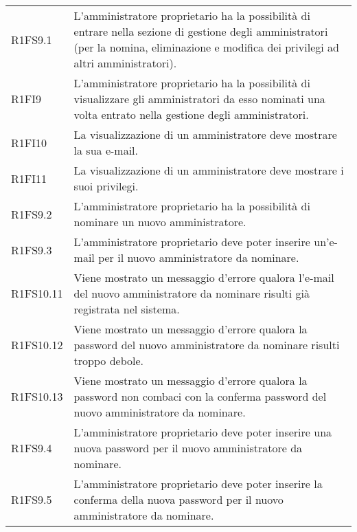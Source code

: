 {\begin{longtable}{ >{\centering}p{} >{}p{}}



R1FS9.1 & L'amministratore proprietario ha la possibilità di entrare nella sezione di gestione degli amministratori (per la nomina, eliminazione e modifica dei privilegi ad altri amministratori). \\

R1FI9 & L'amministratore proprietario ha la possibilità di visualizzare gli amministratori da esso nominati una volta entrato nella gestione degli amministratori. \\

R1FI10 & La visualizzazione di un amministratore deve mostrare la sua e-mail. \\

R1FI11 & La visualizzazione di un amministratore deve mostrare i suoi privilegi. \\

R1FS9.2 & L'amministratore proprietario ha la possibilità di nominare un nuovo amministratore. \\

R1FS9.3 & L'amministratore proprietario deve poter inserire un'e-mail per il nuovo amministratore da nominare. \\

R1FS10.11 & Viene mostrato un messaggio d'errore qualora l'e-mail del nuovo amministratore da nominare risulti già registrata nel sistema. \\

R1FS10.12 & Viene mostrato un messaggio d'errore qualora la password del nuovo amministratore da nominare risulti troppo debole. \\

R1FS10.13 & Viene mostrato un messaggio d'errore qualora la password non combaci con la conferma password del nuovo amministratore da nominare. \\

R1FS9.4 & L'amministratore proprietario deve poter inserire una nuova password per il nuovo amministratore da nominare. \\

R1FS9.5 & L'amministratore proprietario deve poter inserire la conferma della nuova password per il nuovo amministratore da nominare. \\


\end{longtable}}
